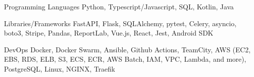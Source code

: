 
\begin{cvskills}

  \cvskill
    {Programming Languages}
    {Python, Typescript/Javascript, SQL, Kotlin, Java}

  \cvskill
    {Libraries/Frameworks}
    {FastAPI, Flask, SQLAlchemy, pytest, Celery, asyncio, boto3, Stripe, Pandas, ReportLab, Vue.js, React, Jest, \newline Android SDK}

  \cvskill
    {DevOps}
    {Docker, Docker Swarm, Ansible, Github Actions, TeamCity, AWS (EC2, EBS, RDS, ELB, S3, ECS, ECR, AWS Batch, \newline IAM, VPC, Lambda, and more), PostgreSQL, Linux, NGINX, Traefik}

\end{cvskills}